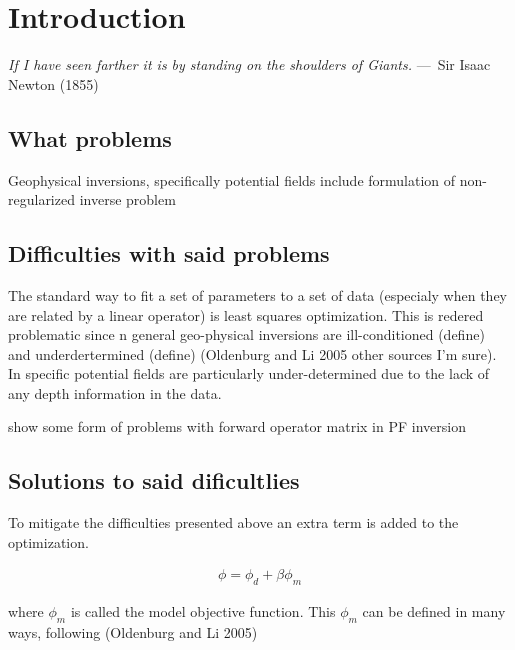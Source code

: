 
\chapter{Introduction}
\label{ch:Introduction}

\begin{epigraph}
    \emph{If I have seen farther it is by standing on the shoulders of
    Giants.} ---~Sir Isaac Newton (1855)
\end{epigraph}


\section{What problems}
\label{What problems}

Geophysical inversions, specifically potential fields 
include formulation of non-regularized inverse problem

\section{Difficulties with said problems }
\label{Difficulties with said problems }

The standard way to fit a set of parameters to a set of data (especialy when they are related by a linear operator) is least squares optimization. This is redered problematic since n general geo-physical inversions are ill-conditioned (define) and underdertermined (define) (Oldenburg and Li 2005 other sources I'm sure). In specific potential fields are particularly under-determined due to the lack of any depth information in the data.

show some form of problems with forward operator matrix in PF inversion

\section{Solutions to said dificultlies}
\label{Solutions to said dificultlies}

To mitigate the difficulties presented above an extra term is added to the optimization. 

\begin{align}
\phi = \phi_d + \beta\phi_m
\end{align}

where $\phi_m$ is called the model objective function. This $\phi_m$ can be defined in many ways, following  (Oldenburg and Li 2005)

